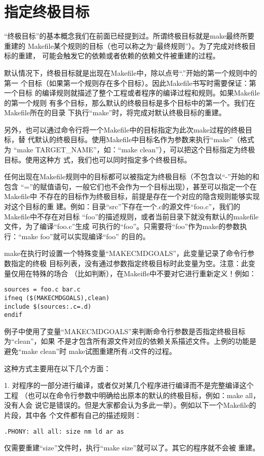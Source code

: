 \section{指定终极目标}
“终极目标”的基本概念我们在前面已经提到过。所谓终极目标就是make最终所要重建的
Makefile某个规则的目标（也可以称之为“最终规则”）。为了完成对终极目标的重建，
可能会触发它的依赖或者依赖的依赖文件被重建的过程。

默认情况下，终极目标就是出现在Makefile中，除以点号“.”开始的第一个规则中的第一
个目标（如果第一个规则存在多个目标）。因此Makefile书写时需要保证：第一个目标
的编译规则就描述了整个工程或者程序的编译过程和规则。如果Makefile的第一个规则
有多个目标，那么默认的终极目标是多个目标中的第一个。我们在Makefile所在的目录
下执行“make”时，将完成对默认终极目标的重建。

另外，也可以通过命令行将一个Makefile中的目标指定为此次make过程的终极目标，替
代默认的终极目标。使用Makefile中目标名作为参数来执行“make”（格式为 “make
TARGET\_NAME”，如：“make clean”），可以把这个目标指定为终极目标。使用这种方
式，我们也可以同时指定多个终极目标。

任何出现在Makefile规则中的目标都可以被指定为终极目标（不包含以“-”开始的和包含
“=”的赋值语句，一般它们也不会作为一个目标出现），甚至可以指定一个在Makefile中
不存在的目标作为终极目标，前提是存在一个对应的隐含规则能够实现对这个目标的重
建。例如：目录“src”下存在一个.c的源文件“foo.c”，我们的Makefile中不存在对目标
“foo”的描述规则，或者当前目录下就没有默认的makefile文件，为了编译“foo.c”生成
可执行的“foo”。只需要将“foo”作为make的参数执行：“make foo”就可以实现编译“foo”
的目的。

make在执行时设置一个特殊变量“MAKECMDGOALS”，此变量记录了命令行参数指定的终极
目标列表，没有通过参数指定终极目标时此变量为空。注意：此变量仅用在特殊的场合
（比如判断），在Makeifle中不要对它进行重新定义！例如：

\begin{Verbatim}[]
sources = foo.c bar.c
ifneq ($(MAKECMDGOALS),clean)
include $(sources:.c=.d)
endif
\end{Verbatim}

例子中使用了变量“MAKECMDGOALS”来判断命令行参数是否指定终极目标为“clean”，如果
不是才包含所有源文件对应的依赖关系描述文件。上例的功能是避免“make clean”时
make试图重建所有.d文件的过程。

这种方式主要用在以下几个方面：

1. 对程序的一部分进行编译，或者仅对某几个程序进行编译而不是完整编译这个工程
（也可以在命令行参数中明确给出原本的默认的终极目标，例如：make all，没有人会
说它是错误的。但是大家都会认为多此一举）。例如以下一个Makefile的片段，其中各
个文件都有自己的描述规则：
\begin{Verbatim}[]
.PHONY: all all: size nm ld ar as
\end{Verbatim}
\noindent 仅需要重建“size”文件时，执行“make size”就可以了。其它的程序就不会被
重建。

